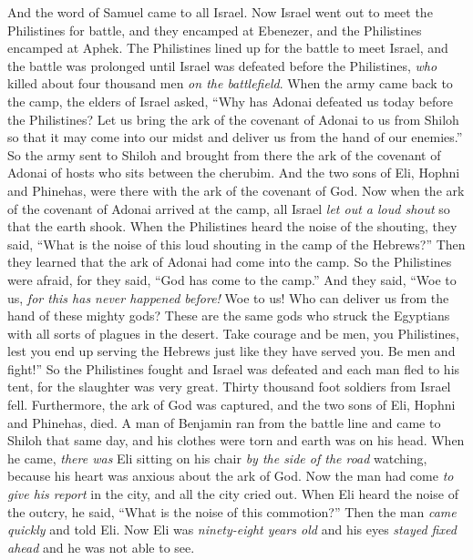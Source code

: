 \begin{biblechapter} %
 And the word of Samuel came to all Israel. Now Israel went out to meet the Philistines for battle, and they encamped at Ebenezer, and the Philistines encamped at Aphek.
\verse The Philistines lined up for the battle to meet Israel, and the battle was prolonged until Israel was defeated before the Philistines, \textit{who} killed about four thousand men \textit{on the battlefield}.
\verse When the army came back to the camp, the elders of Israel asked, “Why has Adonai defeated us today before the Philistines? Let us bring the ark of the covenant of Adonai to us from Shiloh so that it may come into our midst and deliver us from the hand of our enemies.”
\verse So the army sent to Shiloh and brought from there the ark of the covenant of Adonai of hosts who sits between the cherubim. And the two sons of Eli, Hophni and Phinehas, were there with the ark of the covenant of God.
\verse Now when the ark of the covenant of Adonai arrived at the camp, all Israel \textit{let out a loud shout} so that the earth shook.
\verse When the Philistines heard the noise of the shouting, they said, “What is the noise of this loud shouting in the camp of the Hebrews?” Then they learned that the ark of Adonai had come into the camp.
\verse So the Philistines were afraid, for they said, “God has come to the camp.” And they said, “Woe to us, \textit{for this has never happened before!}
\verse Woe to us! Who can deliver us from the hand of these mighty gods? These are the same gods who struck the Egyptians with all sorts of plagues in the desert.
\verse Take courage and be men, you Philistines, lest you end up serving the Hebrews just like they have served you. Be men and fight!”
\verse So the Philistines fought and Israel was defeated and each man fled to his tent, for the slaughter was very great. Thirty thousand foot soldiers from Israel fell.
\verse Furthermore, the ark of God was captured, and the two sons of Eli, Hophni and Phinehas, died.
\verse A man of Benjamin ran from the battle line and came to Shiloh that same day, and his clothes were torn and earth was on his head.
\verse When he came, \textit{there was} Eli sitting on his chair \textit{by the side of the road} watching, because his heart was anxious about the ark of God. Now the man had come \textit{to give his report} in the city, and all the city cried out.
\verse When Eli heard the noise of the outcry, he said, “What is the noise of this commotion?” Then the man \textit{came quickly} and told Eli.
\verse Now Eli was \textit{ninety-eight years old} and his eyes \textit{stayed fixed ahead} and he was not able to see.

\end{biblechapter}
